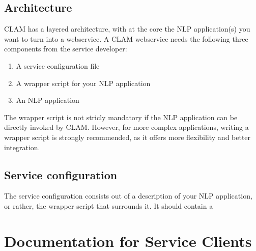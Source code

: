 \section{Architecture}

CLAM has a layered architecture, with at the core the NLP application(s) you want to turn into a webservice. A CLAM webservice needs the following three components from the service developer:

\begin{enumerate}
\item A service configuration file
\item A wrapper script for your NLP application
\item An NLP application
\end{enumerate}

The wrapper script is not stricly mandatory if the NLP application can be directly invoked by CLAM. However, for more complex applications, writing a wrapper script is strongly recommended, as it offers more flexibility and better integration.




\section{Service configuration}

The service configuration consists out of a description of your NLP application, or rather, the wrapper script that surrounds it. It should contain a 




\chapter{Documentation for Service Clients}




